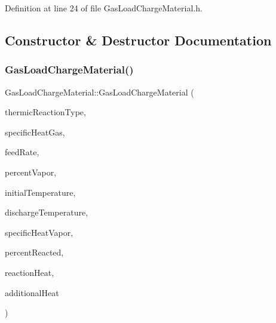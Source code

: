 Definition at line 24 of file Gas\+Load\+Charge\+Material.\+h.



\subsection{Constructor \& Destructor Documentation}
\mbox{\label{class_gas_load_charge_material_a4ad94a94d25bad9eaeca4947d879f35f}} 
\subsubsection{\texorpdfstring{Gas\+Load\+Charge\+Material()}{GasLoadChargeMaterial()}}
{\footnotesize\ttfamily Gas\+Load\+Charge\+Material\+::\+Gas\+Load\+Charge\+Material (\begin{DoxyParamCaption}\item[{const \hyperlink{class_load_charge_material_a51d4263e865a5d86236622dd3fe23fd1}{Load\+Charge\+Material\+::\+Thermic\+Reaction\+Type}}]{thermic\+Reaction\+Type,  }\item[{const double}]{specific\+Heat\+Gas,  }\item[{const double}]{feed\+Rate,  }\item[{const double}]{percent\+Vapor,  }\item[{const double}]{initial\+Temperature,  }\item[{const double}]{discharge\+Temperature,  }\item[{const double}]{specific\+Heat\+Vapor,  }\item[{const double}]{percent\+Reacted,  }\item[{const double}]{reaction\+Heat,  }\item[{const double}]{additional\+Heat }\end{DoxyParamCaption})\hspace{0.3cm}{\ttfamily [inline]}}

